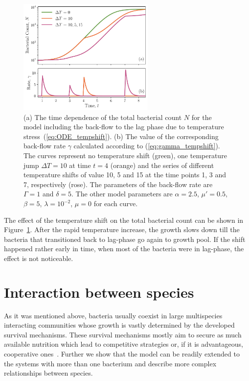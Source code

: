 \documentclass[10pt,A4paper]{article}
\begin{document}
\begin{figure}[t]
    \begin{center}
    \includegraphics[width=0.6\textwidth]{Figures/pool_model_3pools_resource_tempshift.pdf}
    \caption{
        (a) The time dependence of the total bacterial count $N$ for the model including the back-flow to the lag phase due to temperature stress~(\ref{eq:ODE_tempshift}).
        (b) The value of the corresponding back-flow rate $\gamma$ calculated according to (\ref{eq:gamma_tempshift}).
        The curves represent no temperature shift (green), one temperature jump $\Delta T = 10$ at time $t=4$ (orange)
        and the series of different temperature shifts of value 10, 5 and 15 at the time points 1, 3 and 7, respectively (rose).
        The parameters of the back-flow rate are $\Gamma=1$ and $\delta=5$.
        The other model parameters are $\alpha=2.5$, $\mu'=0.5$, $\beta=5$, $\lambda=10^{-2}$, $\mu = 0$ for each curve.
    }
    \label{fig:TempJump}
    \end{center}
\end{figure}
The effect of the temperature shift on the total bacterial count can be shown in Figure~\ref{fig:TempJump}.
After the rapid temperature increase, the growth slows down till the bacteria that transitioned back to lag-phase go again to growth pool.
If the shift happened rather early in time, when most of the bacteria were in lag-phase, the effect is not noticeable.
\newpage
%
%
%
\section{Interaction between species}
As it was mentioned above, bacteria usually coexist in large multispecies interacting communities whose growth is vastly determined by the developed survival mechanisms.
These survival mechanisms mostly aim to secure as much available nutrition which lead to competitive strategies or, if it is advantageous, cooperative ones~\cite{hibbing_bacterial_2010, stubbendieck_bacterial_2016}.
Further we show that the model can be readily extended to the systems with more than one bacterium and describe more complex relationships between species. 
%
%
%
\end{document}
